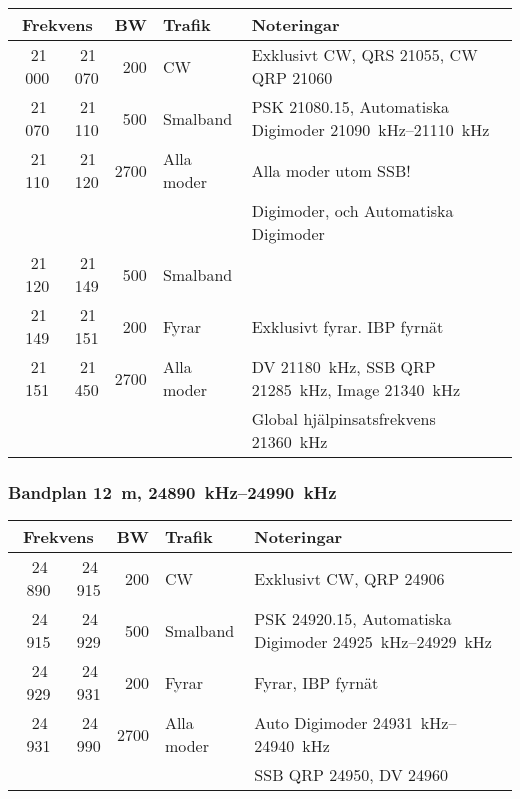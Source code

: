 \begin{tabular}{rrrll}
\multicolumn{2}{c}{\textbf{Frekvens}} & \textbf{BW} & \textbf{Trafik} & \textbf{Noteringar} \\ \hline

21\,000 & 21\,070 & 200  & CW         & Exklusivt CW, QRS \num{21055}, CW QRP \num{21060}                                          \\ \hline
21\,070 & 21\,110 & 500  & Smalband   & PSK \num{21080,15}, Automatiska Digimoder \SIrange{21090}{21110}{\kilo\hertz}              \\
21\,110 & 21\,120 & 2700 & Alla moder & Alla moder utom SSB!                                                                       \\
        &         &      &            & Digimoder, och Automatiska Digimoder                                                       \\ \hline
21\,120 & 21\,149 & 500  & Smalband   &                                                                                            \\ \hline
21\,149 & 21\,151 & 200  & Fyrar      & Exklusivt fyrar. IBP fyrnät                                                                \\ \hline
21\,151 & 21\,450 & 2700 & Alla moder & DV \qty{21180}{\kilo\hertz}, SSB QRP \qty{21285}{\kilo\hertz}, Image \qty{21340}{\kilo\hertz} \\
        &         &      &            & Global hjälpinsatsfrekvens \qty{21360}{\kilo\hertz}                                         \\ \hline
\end{tabular}

\subsubsection{Bandplan \qty{12}{\metre}, \SIrange{24890}{24990}{\kilo\hertz}}
\begin{tabular}{rrrll}
\multicolumn{2}{c}{\textbf{Frekvens}} & \textbf{BW} & \textbf{Trafik} & \textbf{Noteringar} \\ \hline

24\,890 & 24\,915 & 200  & CW         & Exklusivt CW, QRP \num{24906}                      \\ \hline
24\,915 & 24\,929 & 500  & Smalband   & PSK \num{24920,15}, Automatiska
                                        Digimoder \SIrange{24925}{24929}{\kilo\hertz}      \\ \hline
24\,929 & 24\,931 & 200  & Fyrar      & Fyrar, IBP fyrnät                                  \\ \hline
24\,931 & 24\,990 & 2700 & Alla moder & Auto Digimoder \SIrange{24931}{24940}{\kilo\hertz} \\
        &         &      &            & SSB QRP \num{24950}, DV \num{24960}{}              \\ \hline
\end{tabular}

